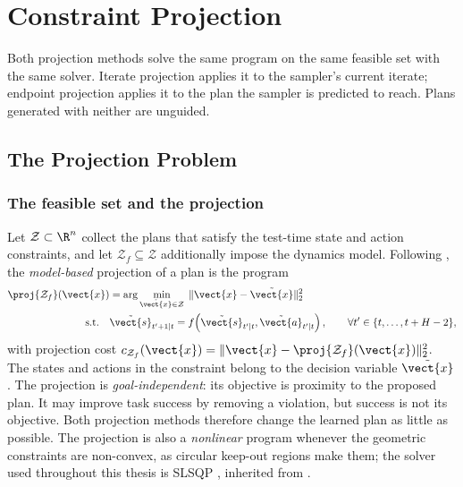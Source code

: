 \section{Constraint Projection}\label{sec:method:projection}

Both projection methods solve the same program on the same feasible set with the same solver. Iterate
projection applies it to the sampler's current iterate; endpoint projection applies it to the plan the
sampler is predicted to reach. Plans generated with neither are unguided.

\subsection{The Projection Problem}\label{sec:method:proj}

\subsubsection*{The feasible set and the projection}

Let $\mathcal{Z} \subset \R^{n}$ collect the plans that satisfy the test-time state and action
constraints, and let $\mathcal{Z}_{f} \subseteq \mathcal{Z}$ additionally impose the dynamics
model. Following \parencite[Eq.~(9)]{romer2025diffusion}, the \emph{model-based} projection of a plan is the
program
\begin{align}
  \proj{\mathcal{Z}_{f}}(\vect{x})
    &= \arg\min_{\tilde{\vect{x}}\in\mathcal{Z}} \;\|\vect{x}-\tilde{\vect{x}}\|_{2}^{2}
    \label{eq:bg:mpc:proj} \\
  \text{s.t.}\quad & \tilde{\vect{s}}_{t'+1|t}
    = f\!\left(\tilde{\vect{s}}_{t'|t},\tilde{\vect{a}}_{t'|t}\right),
    \qquad \forall t' \in \{t,\dots,t+H-2\},
    \label{eq:bg:mpc:dyn}
\end{align}
with projection cost $c_{\mathcal{Z}_{f}}(\vect{x}) = \|\vect{x}-\proj{\mathcal{Z}_{f}}(\vect{x})\|_{2}^{2}$.
The states and actions in the constraint belong to the decision variable $\tilde{\vect{x}}$.
The projection is \emph{goal-independent}: its objective is proximity to the proposed plan.
It may improve task success by removing a violation, but success is not its objective. Both projection methods therefore
change the learned plan as little as possible. The projection is
also a \emph{nonlinear} program whenever the geometric
constraints are non-convex, as circular keep-out regions make them; the solver used throughout
this thesis is \ac{SLSQP}
\parencite{kraft1988software,virtanen2020scipy}, inherited from \parencite{romer2025diffusion}.

